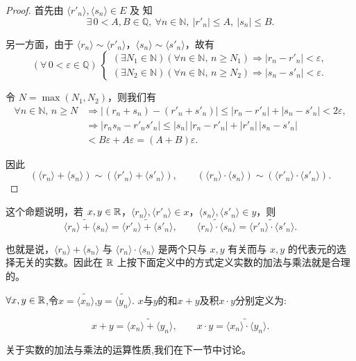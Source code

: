 \begin{proof}

首先由 \(\langle r'_n \rangle, \langle s_n \rangle \in E\) 及 知
\[
\exists\,0<A,B\in\mathbb{Q},\ \forall n\in\mathbb{N},\ |r'_n|\leq A,\ |s_n|\leq B.
\]

另一方面，由于 \(\langle r_n \rangle \sim \langle r'_n \rangle\)，\(\langle s_n \rangle \sim \langle s'_n \rangle\)，故有
\[
(\forall\,0<\varepsilon\in\mathbb{Q})\ 
\begin{cases}
	(\exists N_1\in\mathbb{N})(\forall n\in\mathbb{N},\,n\geqslant N_1) \Longrightarrow |r_n-r'_n|< \varepsilon,\\[4pt]
	(\exists N_2\in\mathbb{N})(\forall n\in\mathbb{N},\,n\geqslant N_2) \Longrightarrow |s_n-s'_n|<\varepsilon.
\end{cases}
\]

令 \(N=\max(N_1,N_2)\)，则我们有
\begin{align*}
	\forall n\in\mathbb{N},\,n\geqslant N &\Longrightarrow |(r_n+s_n)-(r'_n+s'_n)|
	\leq |r_n-r'_n| + |s_n-s'_n| < 2\varepsilon,\\[4pt]
	&\Longrightarrow |r_n s_n - r'_n s'_n|
	\leq |s_n|\,|r_n-r'_n| + |r'_n|\,|s_n-s'_n| \\
	& < B\varepsilon + A\varepsilon = (A+B)\varepsilon.
\end{align*}

因此
\[
(\langle r_n \rangle + \langle s_n \rangle) \sim (\langle r'_n \rangle + \langle s'_n \rangle),\qquad
(\langle r_n \rangle \cdot \langle s_n \rangle) \sim (\langle r'_n \rangle \cdot \langle s'_n \rangle).
\]

\end{proof}

这个命题说明，若 \(x,y\in \mathbb{R}\)，\(\langle r_n\rangle,\langle r'_n\rangle\in x\)，\(\langle s_n\rangle,\langle s'_n\rangle\in y\)，则
\[
\widetilde{\langle r_n\rangle+\langle s_n\rangle}
= \widetilde{\langle r'_n\rangle+\langle s'_n\rangle},\qquad
\widetilde{\langle r_n\rangle\cdot\langle s_n\rangle}
= \widetilde{\langle r'_n\rangle\cdot\langle s'_n\rangle}.
\]

也就是说，\(\langle r_n\rangle+\langle s_n\rangle\) 与 \(\langle r_n\rangle\cdot\langle s_n\rangle\) 是两个只与 \(x,y\) 有关而与 \(x,y\) 的代表元的选择无关的实数。因此在 \(\mathbb{R}\) 上按下面定义中的方式定义实数的加法与乘法就是合理的。

\begin{mydef*}{}

\(\forall x,y\in\mathbb {\mathbb{R}}\),令\(x=\widetilde{\langle x_n\rangle}\),\(y=\widetilde{\langle y_n\rangle}\). \(x\)与\(y\)的和\(x+y\)及积\(x\cdot y\)分别定义为:

\[x+y=\widetilde{\langle x_n\rangle+\langle y_n\rangle},\qquad
x\cdot y=\widetilde{\langle x_n\rangle\cdot\langle y_n\rangle}.\]

关于实数的加法与乘法的运算性质,我们在下一节中讨论。


\end{mydef*}


